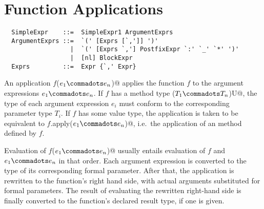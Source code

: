 
\section{Function Applications}
\label{sec:apply}

\syntax\begin{lstlisting}
  SimpleExpr    ::=  SimpleExpr1 ArgumentExprs
  ArgumentExprs ::=  `(' [Exprs [`,']] ')'
                  |  `(' [Exprs `,'] PostfixExpr `:' `_' `*' ')'
                  |  [nl] BlockExpr
  Exprs         ::=  Expr {`,' Expr}
\end{lstlisting}

An application \lstinline@$f$($e_1 \commadots e_n$)@ applies the function $f$ to the
argument expressions $e_1 \commadots e_n$. If $f$ has a method type
\lstinline@($T_1 \commadots T_n$)U@, the type of each argument
expression $e_i$ must conform to the corresponding parameter type
$T_i$. If $f$ has some value type, the application is taken to be
equivalent to \lstinline@$f$.apply($e_1 \commadots e_n$)@, i.e.\ the
application of an  method defined by $f$.


Evaluation of \lstinline@$f$($e_1 \commadots e_n$)@ usually entails evaluation of
$f$ and $e_1 \commadots e_n$ in that order. Each argument expression
is converted to the type of its corresponding formal parameter.  After
that, the application is rewritten to the function's right hand side,
with actual arguments substituted for formal parameters.  The result
of evaluating the rewritten right-hand side is finally converted to
the function's declared result type, if one is given.

